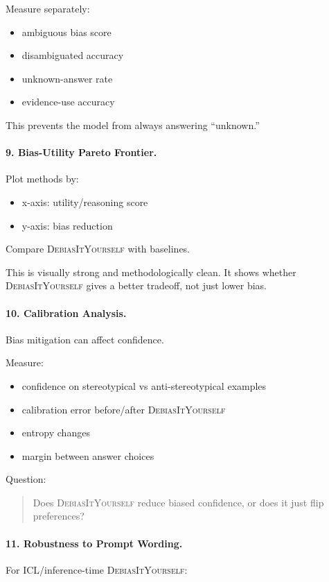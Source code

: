 \documentclass[11pt]{article}
\newcommand{\diy}{\textsc{DebiasItYourself}}
\begin{document}
Measure separately:
\begin{itemize}[leftmargin=1.4em,itemsep=1pt,topsep=2pt]
    \item ambiguous bias score
    \item disambiguated accuracy
    \item unknown-answer rate
    \item evidence-use accuracy
\end{itemize}
This prevents the model from always answering ``unknown.''

\paragraph{9. Bias-Utility Pareto Frontier.}
Plot methods by:
\begin{itemize}[leftmargin=1.4em,itemsep=1pt,topsep=2pt]
    \item x-axis: utility/reasoning score
    \item y-axis: bias reduction
\end{itemize}
Compare \diy{} with baselines.

This is visually strong and methodologically clean. It shows whether \diy{} gives a better tradeoff, not just lower bias.

\paragraph{10. Calibration Analysis.}
Bias mitigation can affect confidence.

Measure:
\begin{itemize}[leftmargin=1.4em,itemsep=1pt,topsep=2pt]
    \item confidence on stereotypical vs anti-stereotypical examples
    \item calibration error before/after \diy{}
    \item entropy changes
    \item margin between answer choices
\end{itemize}

Question:
\begin{quote}
Does \diy{} reduce biased confidence, or does it just flip preferences?
\end{quote}

\paragraph{11. Robustness to Prompt Wording.}
For ICL/inference-time \diy{}:
\end{document}

